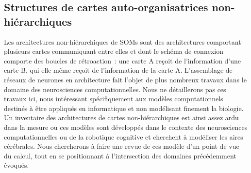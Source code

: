 \documentclass[../main]{subfiles}
\begin{document}


\subsection{Structures de cartes auto-organisatrices non-hiérarchiques}

Les architectures non-hiérarchiques de SOMs sont des architectures comportant plusieurs cartes communiquant entre elles et dont le schéma de connexion comporte des boucles de rétroaction~: une carte A reçoit de l'information d'une carte B, qui elle-même reçoit de l'information de la carte A.
L'assemblage de réseaux de neurones en architecture fait l'objet de plus nombreux travaux dans le domaine des neurosciences computationnelles. Nous ne détaillerons pas ces travaux ici, nous intéressant spécifiquement aux modèles computationnels destinés à être appliqués en informatique et non modélisant finement la biologie.
Un inventaire des architectures de cartes non-hiérarchiques est ainsi assez ardu dans la mesure ou ces modèles sont développés dans le contexte des neurosciences computationnelles ou de la robotique cognitive et cherchent à modéliser les aires cérébrales. 
Nous chercherons à faire une revue de ces modèle d'un point de vue du calcul, tout en se positionnant à l'intersection des domaines précédemment évoqués.
\end{document}
